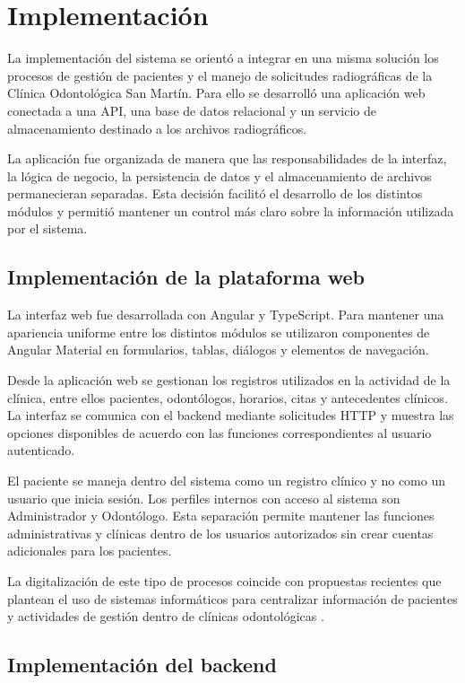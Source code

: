 \section{Implementación}

La implementación del sistema se orientó a integrar en una misma solución
los procesos de gestión de pacientes y el manejo de solicitudes radiográficas
de la Clínica Odontológica San Martín. Para ello se desarrolló una aplicación
web conectada a una API, una base de datos relacional y un servicio de
almacenamiento destinado a los archivos radiográficos.

La aplicación fue organizada de manera que las responsabilidades de la
interfaz, la lógica de negocio, la persistencia de datos y el almacenamiento
de archivos permanecieran separadas. Esta decisión facilitó el desarrollo de
los distintos módulos y permitió mantener un control más claro sobre la
información utilizada por el sistema.

\subsection{Implementación de la plataforma web}

La interfaz web fue desarrollada con Angular y TypeScript. Para mantener una
apariencia uniforme entre los distintos módulos se utilizaron componentes de
Angular Material en formularios, tablas, diálogos y elementos de navegación.

Desde la aplicación web se gestionan los registros utilizados en la actividad
de la clínica, entre ellos pacientes, odontólogos, horarios, citas y
antecedentes clínicos. La interfaz se comunica con el backend mediante
solicitudes HTTP y muestra las opciones disponibles de acuerdo con las
funciones correspondientes al usuario autenticado.

El paciente se maneja dentro del sistema como un registro clínico y no como
un usuario que inicia sesión. Los perfiles internos con acceso al sistema son
Administrador y Odontólogo. Esta separación permite mantener las funciones
administrativas y clínicas dentro de los usuarios autorizados sin crear
cuentas adicionales para los pacientes.

La digitalización de este tipo de procesos coincide con propuestas recientes
que plantean el uso de sistemas informáticos para centralizar información de
pacientes y actividades de gestión dentro de clínicas odontológicas
\parencite{ho2024}.

\subsection{Implementación del backend}

